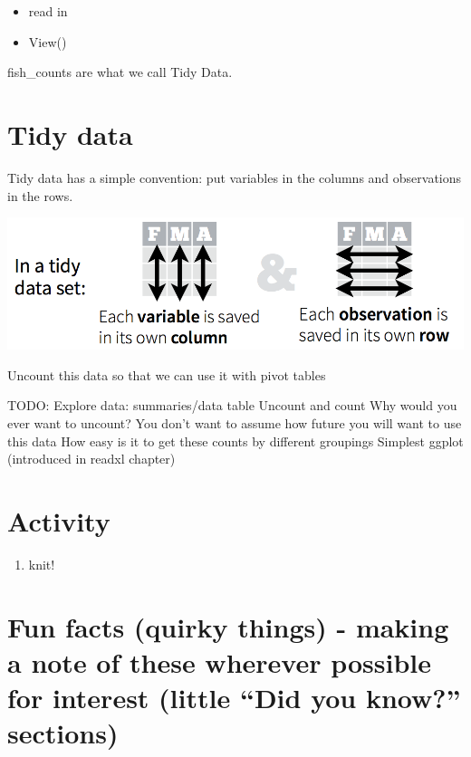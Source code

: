 \documentclass[]{book}
\providecommand{\tightlist}{%
  \setlength{\itemsep}{0pt}\setlength{\parskip}{0pt}}
\begin{document}
\begin{itemize}
\tightlist
\item
  read in
\item
  View()
\end{itemize}

fish\_counts are what we call Tidy Data.

\hypertarget{tidy-data}{%
\section{Tidy data}\label{tidy-data}}

Tidy data has a simple convention: put variables in the columns and observations in the rows.

\includegraphics[width=0.8\linewidth]{img/tidy_data}

Uncount this data so that we can use it with pivot tables

TODO:
Explore data:
summaries/data table
Uncount and count
Why would you ever want to uncount? You don't want to assume how future you will want to use this data
How easy is it to get these counts by different groupings
Simplest ggplot (introduced in readxl chapter)

\hypertarget{activity-4}{%
\section{Activity}\label{activity-4}}

\begin{enumerate}
\def\labelenumi{\arabic{enumi}.}
\tightlist
\item
  knit!
\end{enumerate}

\hypertarget{fun-facts-quirky-things---making-a-note-of-these-wherever-possible-for-interest-little-did-you-know-sections}{%
\section{Fun facts (quirky things) - making a note of these wherever possible for interest (little ``Did you know?'' sections)}\label{fun-facts-quirky-things---making-a-note-of-these-wherever-possible-for-interest-little-did-you-know-sections}}
\end{document}
